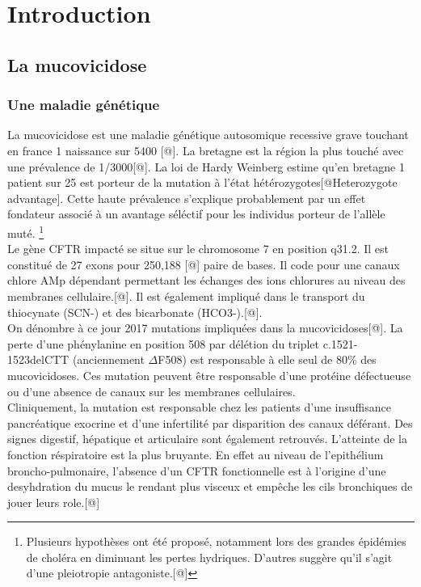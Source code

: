 \documentclass[12pt,a4paper]{article}
\begin{document}
\setcounter{page}{1}

\section{Introduction}
\subsection{La mucovicidose}
\subsubsection{Une maladie génétique}
La mucovicidose est une maladie génétique autosomique recessive grave touchant en france 1 naissance sur 5400 [@]. La bretagne est la région la plus touché avec une prévalence de 1/3000[@].
La loi de Hardy Weinberg estime qu’en bretagne 1 patient sur 25 est porteur de la mutation à l’état hétérozygotes[@Heterozygote advantage]. Cette haute prévalence s’explique probablement par un effet fondateur associé à un avantage séléctif pour les individus porteur de l’allèle muté. \footnote{Plusieurs hypothèses ont été proposé, notamment lors des grandes épidémies de choléra en diminuant les pertes hydriques. D’autres suggère qu'il s'agit d'une pleiotropie antagoniste.[@]} \\
Le gène CFTR impacté se situe sur le chromosome 7 en position q31.2. Il est constitué de 27 exons pour 250,188 [@] paire de bases. Il code pour une canaux chlore AMp dépendant permettant les échanges des ions chlorures au niveau des membranes cellulaire.[@]. Il est également impliqué dans le transport du thiocynate (SCN-) et des bicarbonate (HCO3-).[@]. \\
On dénombre à ce jour 2017 mutations impliquées dans la mucovicidoses[@]. La perte d’une phénylanine en position 508 par délétion du triplet c.1521-1523delCTT (anciennement $\Delta$F508) est responsable à elle seul de 80\% des mucovicidoses.
Ces mutation peuvent être responsable d’une protéine défectueuse ou d’une absence de canaux sur les membranes cellulaires. \\
Cliniquement, la mutation est responsable chez les patients d’une insuffisance pancréatique exocrine et d’une infertilité par disparition des canaux déférant. Des signes digestif, hépatique et articulaire sont également retrouvés.
L'atteinte de la fonction réspiratoire est la plus bruyante. En effet au niveau de l’epithélium broncho-pulmonaire, l’absence d’un CFTR fonctionnelle est à l’origine d’une desyhdration du mucus le rendant plus visceux et empêche les cils bronchiques de jouer leurs role.[@]\\
\end{document}
